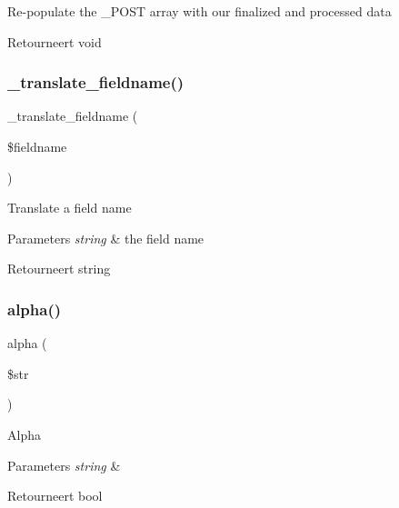 Re-\/populate the \+\_\+\+P\+O\+ST array with our finalized and processed data

\begin{DoxyReturn}{Retourneert}
void 
\end{DoxyReturn}
\mbox{\label{class_c_i___form__validation_ae6b1edc93754376c05622d905845c215}} 
\subsubsection{\texorpdfstring{\_translate\_fieldname()}{\_translate\_fieldname()}}
{\footnotesize\ttfamily \+\_\+translate\+\_\+fieldname (\begin{DoxyParamCaption}\item[{}]{\$fieldname }\end{DoxyParamCaption})\hspace{0.3cm}{\ttfamily [protected]}}

Translate a field name


\begin{DoxyParams}{Parameters}
{\em string} & the field name \\
\hline
\end{DoxyParams}
\begin{DoxyReturn}{Retourneert}
string 
\end{DoxyReturn}
\mbox{\label{class_c_i___form__validation_a4784b18b432005bec36cdf437353ec76}} 
\subsubsection{\texorpdfstring{alpha()}{alpha()}}
{\footnotesize\ttfamily alpha (\begin{DoxyParamCaption}\item[{}]{\$str }\end{DoxyParamCaption})}

Alpha


\begin{DoxyParams}{Parameters}
{\em string} & \\
\hline
\end{DoxyParams}
\begin{DoxyReturn}{Retourneert}
bool 
\end{DoxyReturn}
\mbox{\label{class_c_i___form__validation_a4d1ca92bb78369923e57b2f6aca58c70}} 
